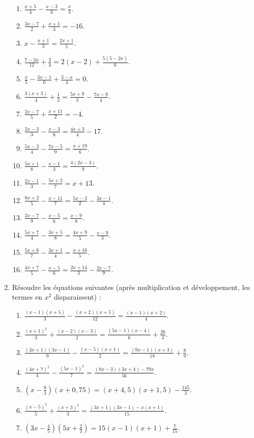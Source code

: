 \documentclass[12 pt]{extarticle}
\theoremstyle{plain}
\begin{document}
\begin{enumerate}
\begin{enumerate}
\item $\frac{x+5}4 - \frac{x-3}6 = \frac{x}3$. 
\item $\frac{3x-7}2 + \frac{x+1}3 = -16$. 
\item $x-\frac{x+1}3 = \frac{2x+1}5$. 
\item $\frac{7-3x}{12} + \frac34 = 2(x-2) + \frac{5(5-2x)}6$. 
\item $\frac{x}5 - \frac{3x-1}6 + \frac{3-x}4 = 0$.
\item $\frac{3(x+3)}4 + \frac12 = \frac{5x+9}3 - \frac{7x-9}4$. 
\item $\frac{2x-7}5 + \frac{x+11}2 = -4$. 
\item $\frac{2x-3}3 - \frac{x-3}6 = \frac{4x+3}4 - 17$. 
\item $\frac{5x-3}4 - \frac{7x-5}9 = \frac{x+19}6$. 
\item $\frac{5x+1}8-\frac{x-1}3 = \frac{4(2x-3)}9$. 
\item $\frac{2x-1}3 - \frac{5x+2}7 = x +13$. 
\item $\frac{8x+2}5 - \frac{x-11}7 = \frac{5x-3}2 - \frac{3x-1}4$.
\item $\frac{2x-7}9 - \frac{x-5}6 = \frac{x-9}8$. 
\item $\frac{5x+7}4 - \frac{3x+5}8 = \frac{4x+9}5 - \frac{x-9}3$. 
\item $\frac{5x+6}7 - \frac{3x+1}4 = \frac{x+16}5$. 
\item $\frac{4x+7}5 -\frac{x-5}6 = \frac{2x+14}3 - \frac{2x-7}9$. 
\end{enumerate}
\item Résoudre les équations suivantes (après multiplication et développement, les termes en $x^2$ disparaissent) : 
\begin{enumerate}
\item $\frac{(x-1)(x+5)}3 - \frac{(x+2)(x+5)}{12} = \frac{(x-1)(x+2)}4$.
\item $\frac{(x+1)^2}3 + \frac{(x-2)(x-3)}2 = \frac{(5x-1)(x-4)}6 + \frac{28}3$. 
\item $\frac{(3x+1)(3x-1)}9 - \frac{(x-5)(x+1)}2 = \frac{(9x-1)(x+3)}{18} + \frac89$. 
\item $\frac{(4x+7)^2}4 - \frac{(5x-1)^2}7 = \frac{(8x-3)(3x+4)-79x}{56}$. 
\item $\left(x-\frac83\right)(x+0,75) = (x+4,5)(x+1,5) - \frac{145}3$. 
\item $\frac{(x-5)^2}5 + \frac{(x+3)^2}3 = \frac{(3x+1)(3x-1)-x(x+1)}{15}$. 
\item $\left(3x-\frac45\right)\left(5x+\frac23\right)
=15 (x-1)(x+1)+\frac7{15}$. 
\end{enumerate}
\end{enumerate}
\end{document}
